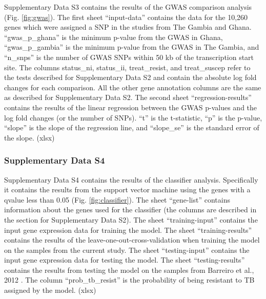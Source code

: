 \documentclass[fleqn,10pt]{wlscirep}
\begin{document}
Supplementary Data S3 contains the results of the GWAS comparison
analysis (Fig. \ref{fig:gwas}). The first sheet “input-data” contains
the data for the 10,260 genes which were assigned a SNP in the studies
from The Gambia and Ghana. “gwas\_p\_ghana” is the minimum p-value
from the GWAS in Ghana, “gwas\_p\_gambia” is the minimum p-value from
the GWAS in The Gambia, and “n\_snps” is the number of GWAS SNPs
within 50 kb of the transcription start site. The columns status\_ni,
status\_ii, treat\_resist, and treat\_suscep refer to the tests
described for Supplementary Data S2 and contain the absolute log fold
changes for each comparison. All the other gene annotation columns are
the same as described for Supplementary Data S2. The second sheet
“regression-results” contains the results of the linear regression
between the GWAS p-values and the log fold changes (or the number of
SNPs). “t” is the t-statistic, “p” is the p-value, “slope” is the
slope of the regression line, and “slope\_se” is the standard error of
the slope. (xlsx)
\subsubsection*{Supplementary Data S4}

Supplementary Data S4 contains the results of the classifier analysis.
Specifically it contains the results from the support vector machine
using the genes with a qvalue less than 0.05 (Fig.
\ref{fig:classifier}). The sheet “gene-list” contains information
about the genes used for the classifier (the columns are described in
the section for Supplementary Data S2). The sheet “training-input”
contains the input gene expression data for training the model. The
sheet “training-results” contains the results of the
leave-one-out-cross-validation when training the model on the samples
from the current study.  The sheet “testing-input” contains the input
gene expression data for testing the model. The sheet
“testing-results” contains the results from testing the model on the
samples from Barreiro et al., 2012 \cite{Barreiro2012}. The column
“prob\_tb\_resist” is the probability of being resistant to TB
assigned by the model. (xlsx)
\end{document}
